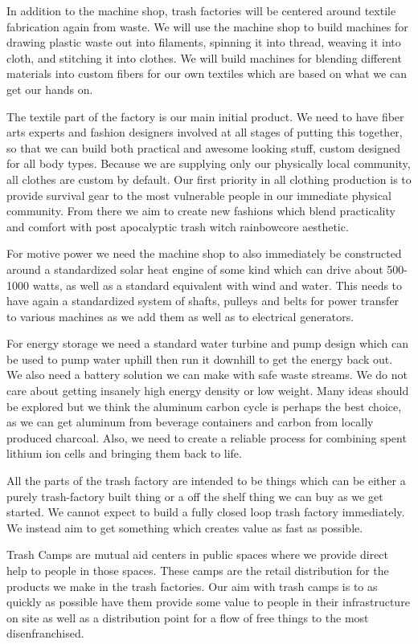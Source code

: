 In addition to the machine shop, trash factories will be centered around textile fabrication again from waste.  We will use the machine shop to build machines for drawing plastic waste out into filaments, spinning it into thread, weaving it into cloth, and stitching it into clothes.  We will build machines for blending different materials into custom fibers for our own textiles which are based on what we can get our hands on. 

The textile part of the factory is our main initial product.  We need to have fiber arts experts and fashion designers involved at all stages of putting this together, so that we can build both practical and awesome looking stuff, custom designed for all body types.  Because we are supplying only our physically local community, all clothes are custom by default.  Our first priority in all clothing production is to provide survival gear to the most vulnerable people in our immediate physical community. From there we aim to create new fashions which blend practicality and comfort with post apocalyptic trash witch rainbowcore aesthetic.

For motive power we need the machine shop to also immediately be constructed around a standardized solar heat engine of some kind which can drive about 500-1000 watts, as well as a standard equivalent with wind and water.  This needs to have again a standardized system of shafts, pulleys and belts for power transfer to various machines as we add them as well as to electrical generators.  

For energy storage we need a standard water turbine and pump design which can be used to pump water uphill then run it downhill to get the energy back out.  We also need a battery solution we can make with safe waste streams.  We do not care about getting insanely high energy density or low weight.  Many ideas should be explored but we think the aluminum carbon cycle is perhaps the best choice, as we can get aluminum from beverage containers and carbon from locally produced charcoal.  Also, we need to create a reliable process for combining spent lithium ion cells and bringing them back to life.  

All the parts of the trash factory are intended to be things which can be either a purely trash-factory built thing or a off the shelf thing we can buy as we get started.  We cannot expect to build a fully closed loop trash factory immediately.  We instead aim to get something which creates value as fast as possible. 

Trash Camps are mutual aid centers in public spaces where we provide direct help to people in those spaces.  These camps are the retail distribution for the products we make in the trash factories.  Our aim with trash camps is to as quickly as possible have them provide some value to people in their infrastructure on site as well as a distribution point for a flow of free things to the most disenfranchised.

